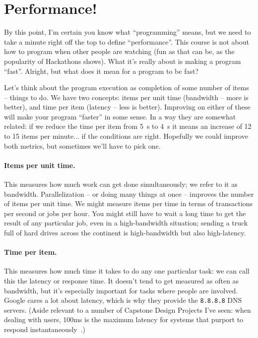 




\section*{Performance!}
By this point, I'm certain you know what ``programming'' means, but we need to take a minute right off the top to define ``performance''. This course is not about how to program when other people are watching (fun as that can be, as the popularity of Hackathons shows). What it's really about is making a program ``fast''. Alright, but what does it mean for a program to be fast?

Let's think about the program execution as completion of some number of items -- things to do. We have two concepts: items per unit time (bandwidth -- more is better), and time per item (latency -- less is better). Improving on either of these will make your program ``faster'' in some sense. In a way they are somewhat related: if we reduce the time per item from 5~s to 4~s it means an increase of 12 to 15 items per minute... if the conditions are right. Hopefully we could improve both metrics, but sometimes we'll have to pick one.

\paragraph{Items per unit time.} This measures how much work can get 
done simultaneously; we refer to it as bandwidth.
Parallelization -- or doing many things at once -- improves the number
of items per unit time. We might measure items per time in terms of
transactions per second or jobs per hour. You might still have to wait
a long time to get the result of any particular job, even in a
high-bandwidth situation; sending a truck full of hard drives across
the continent is high-bandwidth but also high-latency.

\paragraph{Time per item.} This measures how much time it takes to do
any one particular task: we can call this the latency or response time.
It doesn't tend to get measured as often as bandwidth, but it's especially
important for tasks where people are involved. Google cares a lot about
latency, which is why they provide the {\tt 8.8.8.8} DNS servers.
(Aside relevant to a number of Capstone Design Projects I've seen:
when dealing with users, 100ms is the maximum latency for
systems that purport to respond instantaneously~\cite{nielsen93:_respon_times}.)

